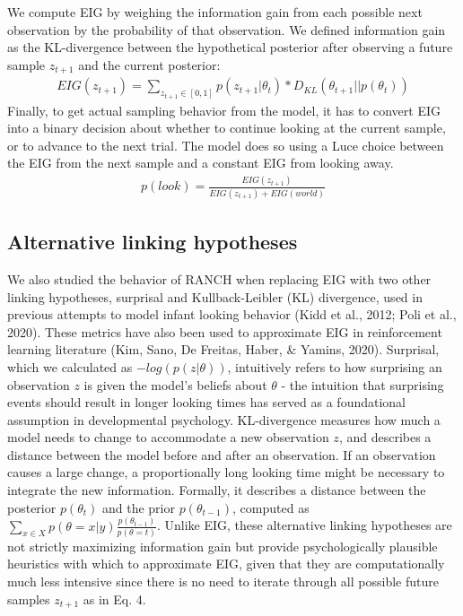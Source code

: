 \documentclass[10pt, letterpaper]{article}
\begin{document}
We compute EIG by weighing the information gain from each possible next
observation by the probability of that observation. We defined
information gain as the KL-divergence between the hypothetical posterior
after observing a future sample \(z_{t+1}\) and the current posterior:
\begin{eqnarray}
EIG(z_{t+1}) = \sum_{z_{t+1} \in [0,1]} p(z_{t+1}|\theta_t) * D_{KL}(\theta_{t+1} || p(\theta_t))
\end{eqnarray} Finally, to get actual sampling behavior from the model,
it has to convert EIG into a binary decision about whether to continue
looking at the current sample, or to advance to the next trial. The
model does so using a Luce choice between the EIG from the next sample
and a constant EIG from looking away. \begin{eqnarray}
p(look) = \frac{EIG(z_{t+1})}{EIG(z_{t+1})+EIG(world)}
\end{eqnarray}

\hypertarget{alternative-linking-hypotheses}{%
\subsection{Alternative linking
hypotheses}\label{alternative-linking-hypotheses}}

We also studied the behavior of RANCH when replacing EIG with two other
linking hypotheses, surprisal and Kullback-Leibler (KL) divergence, used
in previous attempts to model infant looking behavior (Kidd et al.,
2012; Poli et al., 2020). These metrics have also been used to
approximate EIG in reinforcement learning literature (Kim, Sano, De
Freitas, Haber, \& Yamins, 2020). Surprisal, which we calculated as
\(-log(p(z|\theta))\), intuitively refers to how surprising an
observation \(z\) is given the model's beliefs about \(\theta\) - the
intuition that surprising events should result in longer looking times
has served as a foundational assumption in developmental psychology.
KL-divergence measures how much a model needs to change to accommodate a
new observation \(z\), and describes a distance between the model before
and after an observation. If an observation causes a large change, a
proportionally long looking time might be necessary to integrate the new
information. Formally, it describes a distance between the posterior
\(p(\theta_t)\) and the prior \(p(\theta_{t-1})\), computed as
\(\sum_{x \in X}{p(\theta = x|y)\frac{p(\theta_{t-1})}{p(\theta = t)}}\).
Unlike EIG, these alternative linking hypotheses are not strictly
maximizing information gain but provide psychologically plausible
heuristics with which to approximate EIG, given that they are
computationally much less intensive since there is no need to iterate
through all possible future samples \(z_{t+1}\) as in Eq. 4.
\end{document}
